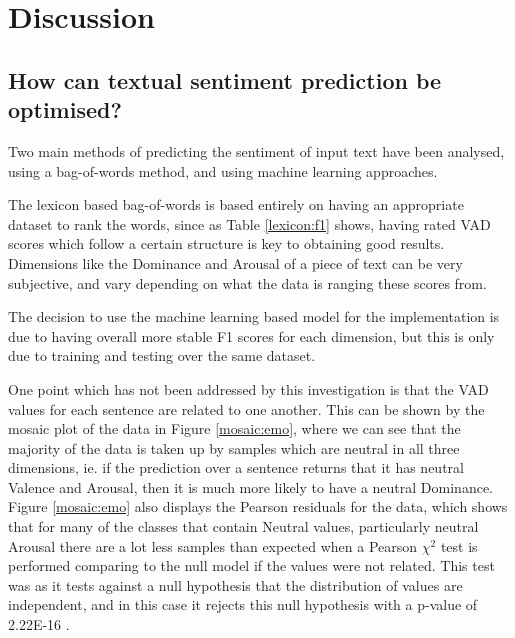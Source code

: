 \section{Discussion} 
\subsection{How can textual sentiment prediction be optimised?}

Two main methods of predicting the sentiment of input text have been analysed, using a bag-of-words method, and using machine learning approaches.

The lexicon based bag-of-words is based entirely on having an appropriate dataset to rank the words, since as Table \ref{lexicon:f1} shows, having rated VAD scores which follow a certain structure is key to obtaining good results. Dimensions like the Dominance and Arousal of a piece of text can be very subjective, and vary depending on what the data is ranging these scores from. 

The decision to use the machine learning based model for the implementation is due to having overall more stable F1 scores for each dimension, but this is only due to training and testing over the same dataset. 

One point which has not been addressed by this investigation is that the VAD values for each sentence are related to one another. This can be shown by the mosaic plot of the data in Figure \ref{mosaic:emo}, where we can see that the majority of the data is taken up by samples which are neutral in all three dimensions, ie. if the prediction over a sentence returns that it has neutral Valence and Arousal, then it is much more likely to have a neutral Dominance. Figure \ref{mosaic:emo} also displays the Pearson residuals for the data, which shows that for many of the classes that contain Neutral values, particularly neutral Arousal there are a lot less samples than expected when a Pearson $\chi^2$ test is performed comparing to the null model if the values were not related. This test was as it tests against a null hypothesis that the distribution of values are independent, and in this case it rejects this null hypothesis with a p-value of 2.22E-16 \cite{zeileis2007residual}.


